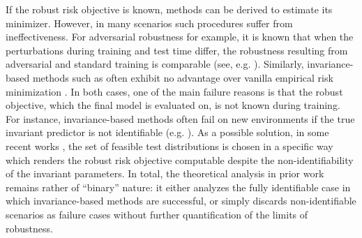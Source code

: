 If the robust risk objective is known, methods can be derived to estimate its minimizer. However, in many scenarios such procedures suffer from ineffectiveness.
For adversarial robustness for example, it is known that when the perturbations during training and test time differ, the robustness resulting from adversarial and standard training is comparable %
(see, e.g. \cite{Tramer19,kang19}). Similarly, invariance-based methods such as \citep{peters2016causal,rojas2018invariant,arjovsky2020invariant,krueger2021out} often exhibit no advantage over vanilla empirical risk minimization \citep{ahuja2020empirical,ahuja2020invariant}.
In both cases, one of the main failure reasons is that the robust objective, which the final model is evaluated on, is not known during training.  For instance, invariance-based methods often fail on new environments if the true invariant predictor is not identifiable (e.g. \citep{kamath2021does,rosenfeld2020risks}). As a possible solution, in some recent works \citep{rothenhausler2021anchor,shen2023causalityoriented}, the set of feasible test distributions is chosen in a specific way which renders the robust risk objective computable despite the non-identifiability of the invariant parameters. 
In total, the theoretical analysis in prior work remains rather of ``binary'' nature: it either analyzes the fully identifiable case in which invariance-based methods are successful, or simply discards non-identifiable scenarios as failure cases without further quantification of the limits of robustness.

